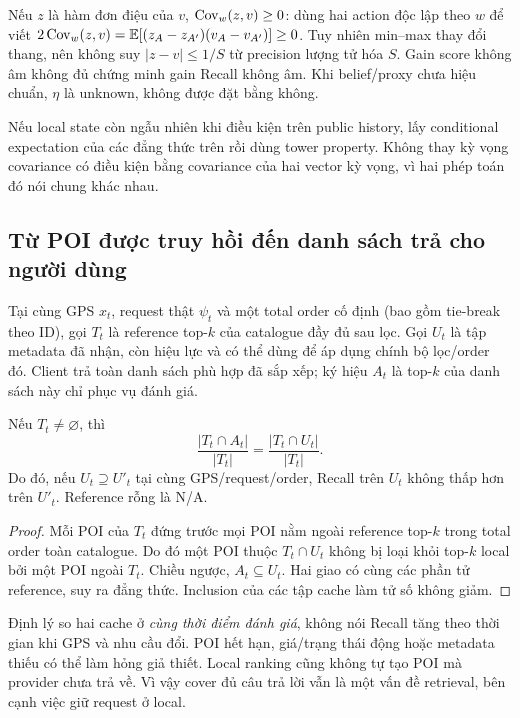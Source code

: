 Nếu $z$ là hàm đơn điệu của $v$, $\operatorname{Cov}_w(z,v)\ge0$: dùng hai action độc lập theo $w$ để viết
$2\operatorname{Cov}_w(z,v)=\mathbb E[(z_A-z_{A'})(v_A-v_{A'})]\ge0$. Tuy nhiên min--max thay đổi thang, nên không suy
$|z-v|\le1/S$ từ precision lượng tử hóa $S$. Gain score không âm không đủ chứng minh gain Recall
không âm. Khi belief/proxy chưa hiệu chuẩn, $\eta$ là unknown, không được đặt bằng không.

Nếu local state còn ngẫu nhiên khi điều kiện trên public history, lấy conditional expectation
của các đẳng thức trên rồi dùng tower property. Không thay kỳ vọng covariance có điều kiện bằng
covariance của hai vector kỳ vọng, vì hai phép toán đó nói chung khác nhau.

\subsection{Từ POI được truy hồi đến danh sách trả cho người dùng}
Tại cùng GPS $x_t$, request thật $\psi_t$ và một total order cố định (bao gồm tie-break theo ID),
gọi $T_t$ là reference top-$k$ của catalogue đầy đủ sau lọc. Gọi $U_t$ là tập metadata đã nhận,
còn hiệu lực và có thể dùng để áp dụng chính bộ lọc/order đó. Client trả toàn danh sách phù hợp
đã sắp xếp; ký hiệu $A_t$ là top-$k$ của danh sách này chỉ phục vụ đánh giá.

\begin{proposition}\label{prop:cache}
Nếu $T_t\ne\varnothing$, thì
\begin{equation}
\frac{|T_t\cap A_t|}{|T_t|}=\frac{|T_t\cap U_t|}{|T_t|}.
\label{eq:recall-union}
\end{equation}
Do đó, nếu $U_t\supseteq U'_t$ tại cùng GPS/request/order, Recall trên $U_t$ không thấp hơn trên
$U'_t$. Reference rỗng là N/A.
\end{proposition}
\begin{proof}
Mỗi POI của $T_t$ đứng trước mọi POI nằm ngoài reference top-$k$ trong total order toàn catalogue.
Do đó một POI thuộc $T_t\cap U_t$ không bị loại khỏi top-$k$ local bởi một POI ngoài $T_t$.
Chiều ngược, $A_t\subseteq U_t$. Hai giao có cùng các phần tử reference, suy ra đẳng thức.
Inclusion của các tập cache làm tử số không giảm.
\end{proof}

Định lý so hai cache ở \emph{cùng thời điểm đánh giá}, không nói Recall tăng theo thời gian khi GPS
và nhu cầu đổi. POI hết hạn, giá/trạng thái động hoặc metadata thiếu có thể làm hỏng giả thiết.
Local ranking cũng không tự tạo POI mà provider chưa trả về. Vì vậy cover đủ câu trả lời vẫn là
một vấn đề retrieval, bên cạnh việc giữ request ở local.

